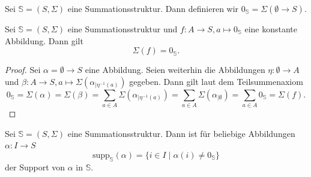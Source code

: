 \documentclass{article}
\begin{document}
\begin{definition}
  Sei $\mathbb{S} = (S, \Sigma)$ eine Summationsstruktur.
  Dann definieren wir $0_\mathbb{S} = \Sigma(\emptyset \to S)$.
\end{definition}

\begin{theorem}\label{Theorem_SumStrukturNeutral}
  Sei $\mathbb{S} = (S, \Sigma)$ eine Summationsstruktur
  und $f \colon A \to S, a \mapsto 0_\mathbb{S}$ eine konstante Abbildung.
  Dann gilt
  \begin{equation*}
    \Sigma(f) = 0_\mathbb{S}.
  \end{equation*}
\end{theorem}
\begin{proof}
  Sei $\alpha = \emptyset \to S$ eine Abbildung.
  Seien weiterhin die Abbildungen
  $\eta \colon \emptyset \to A$
  und $\beta \colon A \to S, a \mapsto \Sigma(\alpha_{\mid \eta^{-1}(a)})$ gegeben.
  Dann gilt laut dem Teilsummenaxiom
  \begin{equation*}
    0_\mathbb{S}
    = \Sigma(\alpha)
    = \Sigma(\beta)
    = \sum_{a \in A} \Sigma(\alpha_{\mid \eta^{-1}(a)})
    = \sum_{a \in A} \Sigma(\alpha_{\mid \emptyset})
    = \sum_{a \in A} 0_\mathbb{S}
    = \Sigma(f).
  \end{equation*}
\end{proof}

\begin{definition}
  Sei $\mathbb{S} = (S, \Sigma)$ eine Summationsstruktur.
  Dann ist für beliebige Abbildungen $\alpha \colon I \to S$
  \begin{equation*}
    \text{supp}_\mathbb{S}(\alpha) = \{i \in I \mid \alpha(i) \neq 0_\mathbb{S}\}
  \end{equation*}
  der Support von $\alpha$ in $\mathbb{S}$.
\end{definition}
\end{document}
